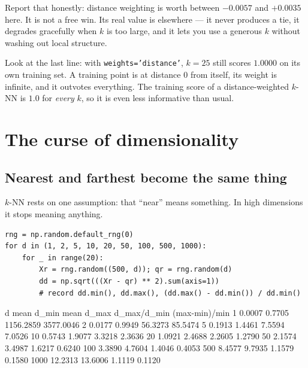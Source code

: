 \documentclass[11pt]{article}
\begin{document}
Report that honestly: distance weighting is worth between $-0.0057$ and
$+0.0035$ here. It is not a free win. Its real value is elsewhere --- it never
produces a tie, it degrades gracefully when $k$ is too large, and it lets you
use a generous $k$ without washing out local structure.

\begin{caution}
Look at the last line: with \texttt{weights='distance'}, $k=25$ still scores
$1.0000$ on its own training set. A training point is at distance $0$ from
itself, its weight is infinite, and it outvotes everything. The training score
of a distance-weighted $k$-NN is $1.0$ for \emph{every} $k$, so it is even less
informative than usual.
\end{caution}

\section{The curse of dimensionality}
\label{sec:curse}

\subsection{Nearest and farthest become the same thing}

$k$-NN rests on one assumption: that ``near'' means something. In high
dimensions it stops meaning anything.

\begin{lstlisting}
rng = np.random.default_rng(0)
for d in (1, 2, 5, 10, 20, 50, 100, 500, 1000):
    for _ in range(20):
        Xr = rng.random((500, d)); qr = rng.random(d)
        dd = np.sqrt(((Xr - qr) ** 2).sum(axis=1))
        # record dd.min(), dd.max(), (dd.max() - dd.min()) / dd.min()
\end{lstlisting}
\begin{codeout}
   d   mean d_min   mean d_max   d_max/d_min   (max-min)/min
   1       0.0007       0.7705    1156.2859       3577.0046
   2       0.0177       0.9949      56.3273         85.5474
   5       0.1913       1.4461       7.5594          7.0526
  10       0.5743       1.9077       3.3218          2.3636
  20       1.0921       2.4688       2.2605          1.2790
  50       2.1574       3.4987       1.6217          0.6240
 100       3.3890       4.7604       1.4046          0.4053
 500       8.4577       9.7935       1.1579          0.1580
1000      12.2313      13.6006       1.1119          0.1120
\end{codeout}
\end{document}
